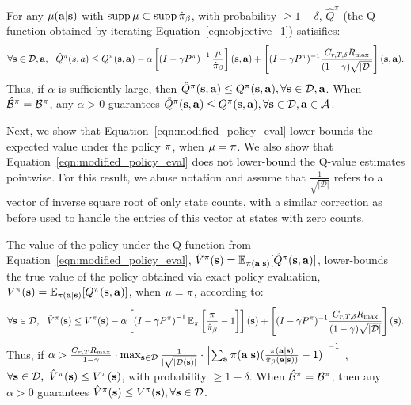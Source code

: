 \begin{theorem} %
\label{thm:min_q_underestimates}
For any $\mu(\mathbf{a}|\mathbf{s})$ with $\operatorname{supp} \mu \subset \operatorname{supp} \hat{\pi}_\beta$, with probability $\geq 1 - \delta$, $\hat{Q}^\pi$ (the Q-function obtained by iterating Equation~\ref{eqn:objective_1}) satisifies:
\begin{equation*}
\forall \mathbf{s} \in \mathcal{D}, \mathbf{a}, ~~ \hat{Q}^\pi(s, a) \leq Q^\pi(\mathbf{s}, \mathbf{a}) - \alpha \left[\left(I - \gamma P^\pi \right)^{-1} \frac{\mu}{\hat{\pi}_\beta} \right](\mathbf{s}, \mathbf{a}) + \left[ (I - \gamma P^\pi)^{-1}\frac{C_{r, T, \delta} R_{\max}}{(1- \gamma) \sqrt{|\mathcal{D}|}} \right](\mathbf{s}, \mathbf{a}).    
\end{equation*}
Thus, if {$\alpha$ is sufficiently large},
then $\hat{Q}^\pi(\mathbf{s}, \mathbf{a})  \leq Q^\pi(\mathbf{s}, \mathbf{a}), \forall \mathbf{s} \in \mathcal{D}, \mathbf{a}$. When $\hat{\mathcal{B}}^\pi = \mathcal{B}^\pi$, any $\alpha > 0$ guarantees $\hat{Q}^\pi(\mathbf{s}, \mathbf{a})  \leq Q^\pi(\mathbf{s}, \mathbf{a}), \forall \mathbf{s} \in \mathcal{D}, \mathbf{a} \in \mathcal{A}$.
\end{theorem}
Next, we show that Equation~\ref{eqn:modified_policy_eval} lower-bounds the expected value under the policy $\pi$, when $\mu = \pi$. We also show that Equation~\ref{eqn:modified_policy_eval} does not lower-bound the Q-value estimates pointwise. {For this result, we abuse notation and assume that $\frac{1}{\sqrt{|\mathcal{D}|}}$ refers to a vector of inverse square root of only state counts, with a similar correction as before used to handle the entries of this vector at states with zero counts.}
\begin{theorem}
\label{thm:cql_underestimates}
The value of the policy under the Q-function from Equation~\ref{eqn:modified_policy_eval}, $\hat{V}^\pi(\mathbf{s}) = \mathbb{E}_{\pi(\mathbf{a}|\mathbf{s})}[\hat{Q}^\pi(\mathbf{s}, \mathbf{a})]$, lower-bounds the true value of the policy obtained via exact policy evaluation, $V^\pi(\mathbf{s}) = \mathbb{E}_{\pi(\mathbf{a}|\mathbf{s})}[Q^\pi(\mathbf{s}, \mathbf{a})]$, when $\mu = \pi$, according to:
\begin{equation*}
\forall \mathbf{s} \in \mathcal{D}, ~~ \hat{V}^\pi(\mathbf{s}) \leq V^\pi(\mathbf{s}) - \alpha \left[\left(I - \gamma P^\pi \right)^{-1} \mathbb{E}_{\pi}\left[\frac{\pi}{\hat{\pi}_\beta} - 1 \right] \right](\mathbf{s}) + \left[ (I - \gamma P^\pi)^{-1} \frac{C_{r, T, \delta} R_{\max}}{(1- \gamma) \sqrt{|\mathcal{D}|}}\right](\mathbf{s}).
\end{equation*}
Thus, if $\alpha > \frac{C_{r, T} R_{\max}}{1 - \gamma} \cdot \max_{\mathbf{s} \in \mathcal{D}} \frac{1}{|\sqrt{|\mathcal{D}(\mathbf{s})|}} \cdot \left[\sum_{\mathbf{a}} \pi(\mathbf{a}|\mathbf{s}) (\frac{\pi(\mathbf{a}|\mathbf{s})}{\hat{\pi}_\beta(\mathbf{a}|\mathbf{s}))} - 1)\right]^{-1}$
,~ $\forall \mathbf{s} \in \mathcal{D},~\hat{V}^\pi(\mathbf{s}) \leq {V}^\pi(\mathbf{s})$, with probability $\geq 1 - \delta$. When $\hat{\mathcal{B}}^\pi = {\mathcal{B}}^\pi$, then any $\alpha > 0$ guarantees $\hat{V}^\pi(\mathbf{s}) \leq V^\pi(\mathbf{s}), \forall \mathbf{s} \in \mathcal{D}$.
\end{theorem}
